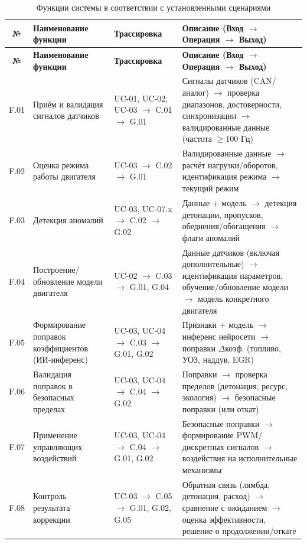 \documentclass[14pt, a4paper]{extarticle}
\begin{document}
					\begin{xltabular}{\textwidth}{|c|L|L|L|}
						\caption{Функции системы в соответствии с установленными сценариями}\label{tab:functions}\\
						\hline
						\textbf{№} & \textbf{Наименование функции} & \textbf{Трассировка} & \textbf{Описание (Вход \(\to\) Операция \(\to\) Выход)} \\
						\hline
						\endfirsthead
						\hline
						\textbf{№} & \textbf{Наименование функции} & \textbf{Трассировка} & \textbf{Описание (Вход \(\to\) Операция \(\to\) Выход)} \\
						\hline
						\endhead
						\hline
						\endfoot
						\hline
						\endlastfoot
						F.01 & Приём и валидация сигналов датчиков & UC-01, UC-02, UC-03 \(\to\) C.01 \(\to\) G.01 & Сигналы датчиков (CAN/аналог) \(\to\) проверка диапазонов, достоверности, синхронизации \(\to\) валидированные данные (частота \(\geq 100\) Гц) \\
						\hline
						F.02 & Оценка режима работы двигателя & UC-03 \(\to\) C.02 \(\to\) G.01 & Валидированные данные \(\to\) расчёт нагрузки/оборотов, идентификация режима \(\to\) текущий режим \\
						\hline
						F.03 & Детекция аномалий & UC-03, UC-07.x \(\to\) C.02 \(\to\) G.02 & Данные + модель \(\to\) детекция детонации, пропусков, обеднения/обогащения \(\to\) флаги аномалий \\
						\hline
						F.04 & Построение/обновление модели двигателя & UC-02 \(\to\) C.03 \(\to\) G.01, G.04 & Данные датчиков (включая дополнительные) \(\to\) идентификация параметров, обучение/обновление модели \(\to\) модель конкретного двигателя \\
						\hline
						F.05 & Формирование поправок коэффициентов (ИИ-инференс) & UC-03, UC-04 \(\to\) C.03 \(\to\) G.01, G.02 & Признаки + модель \(\to\) инференс нейросети \(\to\) поправки \(\Delta\)коэф. (топливо, УОЗ, наддув, EGR) \\
						\hline
						F.06 & Валидация поправок в безопасных пределах & UC-03, UC-04 \(\to\) C.04 \(\to\) G.02 & Поправки \(\to\) проверка пределов (детонация, ресурс, экология) \(\to\) безопасные поправки (или откат) \\
						\hline
						F.07 & Применение управляющих воздействий & UC-03, UC-04 \(\to\) C.04 \(\to\) G.01, G.02 & Безопасные поправки \(\to\) формирование PWM/дискретных сигналов \(\to\) воздействия на исполнительные механизмы \\
						\hline
						F.08 & Контроль результата коррекции & UC-03 \(\to\) C.05 \(\to\) G.01, G.02, G.05 & Обратная связь (лямбда, детонация, расход) \(\to\) сравнение с ожиданием \(\to\) оценка эффективности, решение о продолжении/откате \\

\end{xltabular}
\end{document}
